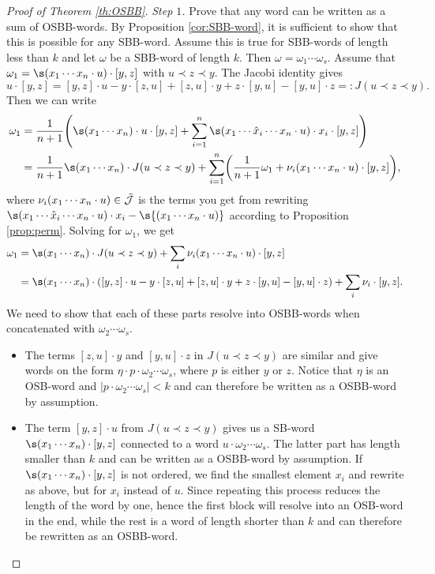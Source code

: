 \documentclass[pdftex]{sigma}
\numberwithin{equation}{section}
\begin{document}
\begin{proof}[Proof of Theorem \ref{th:OSBB}]
 \textit{Step $1$.} Prove that any word can be written as a sum of OSBB-words. By Proposition \ref{cor:SBB-word}, it is sufficient to show that this is possible for any SBB-word. Assume this is true for SBB-words of length less than $k$ and let $\omega$ be a SBB-word of length $k$. Then $\omega= \omega_1 \cdots \omega_s$. Assume that $\omega_1 = \s(x_1 \cdots x_n \cdot u) \cdot [y,z]$ with $u \prec z \prec y$. The Jacobi identity gives
 \[
 u \cdot[y,z] = [y,z] \cdot u - y \cdot [z, u] + [z,u]\cdot y + z \cdot [y,u] - [y,u]\cdot z =: J(u \prec z \prec y).
 \]
 Then we can write
 \[
 \begin{split}
 \omega_1 &= \frac{1}{n+1} \Biggl( \s(x_1 \cdots x_n) \cdot u \cdot [y,z] + \sum_{i=1}^n \s(x_1 \cdots \hat{x}_i \cdots x_n \cdot u)\cdot x_i \cdot [y,z] \Biggr) \\
 &= \frac{1}{n+1} \s(x_1 \cdots x_n) \cdot J(u \prec z \prec y) + \sum_{i=1}^n \biggl( \frac{1}{n+1} \omega_1 + \nu_i(x_1 \cdots x_n \cdot u) \cdot [y,z]\biggr),
 \end{split}
 \]
 where $\nu_i(x_1 \cdots x_n \cdot u) \in \Tilde{\mathcal{J}}$ is the terms you get from rewriting $\s(x_1 \cdots \hat{x}_i \cdots x_n \cdot u) \cdot x_i - \s{(x_1 \cdots x_n \cdot u)}$ according to Proposition \ref{prop:perm}. Solving for $\omega_1$, we get
 \begin{align}
 \omega_1 &= \s(x_1 \cdots x_n) \cdot J(u \prec z \prec y) + \sum_i \nu_i(x_1 \cdots x_n \cdot u) \cdot [y,z]\label{eq:OSBB_rewrite}\\
 &= \s(x_1 \cdots x_n) \cdot ( [y,z] \cdot u - y \cdot [z, u] + [z,u]\cdot y + z \cdot [y,u] - [y,u]\cdot z ) + \sum_i \nu_i \cdot [y,z].\nonumber
 \end{align}
 We need to show that each of these parts resolve into OSBB-words when concatenated with $\omega_2 \cdots \omega_s$.
 \begin{itemize}\itemsep=0pt
 \item The terms $[z,u]\cdot y$ and $[y,u]\cdot z$ in $J(u\prec z\prec y)$ are similar and give words on the form $\eta \cdot p \cdot\omega_2 \cdots \omega_s$, where $p$ is either $y$ or $z$. Notice that $\eta$ is an OSB-word and $|p \cdot \omega_2 \cdots \omega_s|<k$ and can therefore be written as a OSBB-word by assumption.
 \item The term $[y,z]\cdot u$ from $J(u \prec z \prec y)$ gives us a SB-word $\s(x_1 \cdots x_n)\cdot [y,z]$ connected to a word $u \cdot \omega_2 \cdots \omega_s$. The latter part has length smaller than $k$ and can be written as a OSBB-word by assumption. If $\s(x_1 \cdots x_n)\cdot [y,z]$ is not ordered, we find the smallest element $x_i$ and rewrite as above, but for $x_i$ instead of $u$. Since repeating this process reduces the length of the word by one, hence the first block will resolve into an OSB-word in the end, while the rest is a word of length shorter than $k$ and can therefore be rewritten as an OSBB-word.

\end{itemize}
\end{proof}
\end{document}
